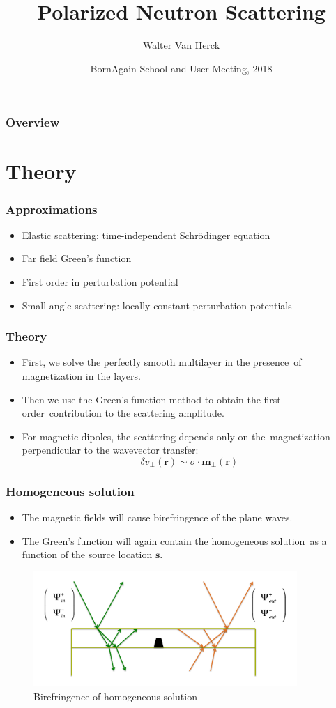 \documentclass{beamer}
\title
{Polarized Neutron Scattering}
\author
{Walter Van Herck\inst{1}}
\institute[JCNS at MLZ] %
{
  \inst{1}%
  J\"ulich Centre for Neutron Science at MLZ
}
\date[BornAgain] %
{BornAgain School and User Meeting, 2018}
\begin{document}
\frame[plain]{\titlepage}

\begin{frame}
    \frametitle{Overview}
    \tableofcontents
\end{frame}

\section{Theory}

\begin{frame}
    \frametitle{Approximations}
    \begin{itemize}
        \item Elastic scattering: time-independent Schrödinger equation
        \item Far field Green's function
        \item First order in perturbation potential
        \item Small angle scattering: locally constant perturbation potentials
    \end{itemize}
\end{frame}

\begin{frame}
    \frametitle{Theory}
    \begin{itemize}
        \item First, we solve the perfectly smooth multilayer in the presence\
              of magnetization in the layers.
        \item Then we use the Green's function method to obtain the first order\
              contribution to the scattering amplitude.
        \item For magnetic dipoles, the scattering depends only on the\
              magnetization perpendicular to the wavevector transfer:
        \[ \delta v_\perp(\mathbf r) \sim \sigma \cdot \mathbf{m_\perp}(\mathbf r)\]
    \end{itemize}
\end{frame}

\begin{frame}
    \frametitle{Homogeneous solution}
    \begin{itemize}
        \item The magnetic fields will cause birefringence of the plane waves.
        \item The Green's function will again contain the homogeneous solution\
              as a function of the source location $\mathbf s$.
    \end{itemize}
    \begin{figure}
        \includegraphics[width=10cm]{birefringence.png}
        \\ Birefringence of homogeneous solution
    \end{figure}
\end{frame}
\end{document}
